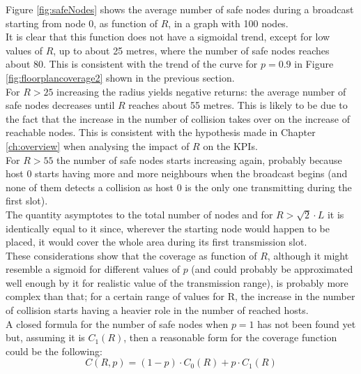 \hfill \break
Figure \ref{fig:safeNodes} shows the average number of safe nodes during a broadcast starting from node 0, as function of $R$, in a graph with 100 nodes.\\
It is clear that this function does not have a sigmoidal trend, except for low values of $R$, up to about 25 metres, where the number of safe nodes reaches about 80. This is consistent with the trend of the curve for $p=0.9$ in Figure \ref{fig:floorplancoverage2} shown in the previous section.\\
For $R > 25$ increasing the radius yields negative returns: the average number of safe nodes decreases until $R$ reaches about 55 metres. This is likely to be due to the fact that the increase in the number of collision takes over on the increase of reachable nodes. This is consistent with the hypothesis made in Chapter \ref{ch:overview} when analysing the impact of $R$ on the KPIs.\\
For $R > 55$ the number of safe nodes starts increasing again, probably because host 0 starts having more and more neighbours when the broadcast begins (and none of them detects a collision as host 0 is the only one transmitting during the first slot).\\ The quantity asymptotes to the total number of nodes and for $R > \sqrt{2}{\cdot}L$ it is identically equal to it since, wherever the starting node would happen to be placed, it would cover the whole area during its first transmission slot.\\
\hfill \break
These considerations show that the coverage as function of $R$, although it might resemble a sigmoid for different values of $p$ (and could probably be approximated well enough by it for realistic value of the transmission range), is probably more complex than that; for a certain range of values for R, the increase in the number of collision starts having a heavier role in the number of reached hosts.\\
A closed formula for the number of safe nodes when $p=1$ has not been found yet but, assuming it is $C_{1}(R)$, then a reasonable form for the coverage function could be the following:
\begin{equation}\label{eq:coverageClosedForm}
C(R, p) = (1-p)\cdot C_{0}(R) + p\cdot C_{1}(R)
\end{equation}

